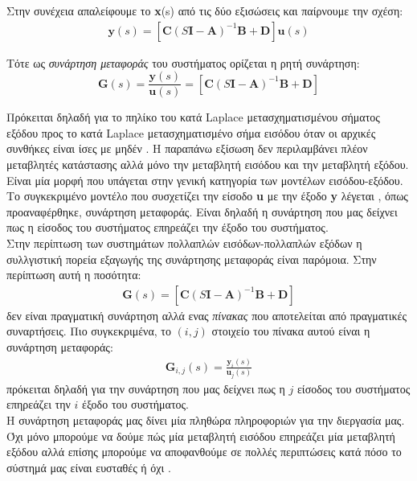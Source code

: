 \documentclass[11pt]{article} %
\numberwithin{equation}{subsection}
\begin{document}
Στην συνέχεια απαλείφουμε το \textbf{x}(s) από τις δύο εξισώσεις και παίρνουμε την σχέση:
\begin{align*}
\textbf{y}(s) = [\textbf{C}(S\textbf{I} - \textbf{A})^{-1}\textbf{B} + \textbf{D}]\textbf{u}(s)
\end{align*}

Τότε ως \textit{συνάρτηση μεταφοράς} του συστήματος ορίζεται η ρητή συνάρτηση:
\begin{equation}
\textbf{G}(s) = \frac{\textbf{y}(s)}{\textbf{u}(s)} =  [\textbf{C}(S\textbf{I} - \textbf{A})^{-1}\textbf{B} + \textbf{D}]
\end{equation}

Πρόκειται δηλαδή για το πηλίκο του κατά Laplace μετασχηματισμένου σήματος εξόδου προς το κατά Laplace μετασχηματισμένο σήμα εισόδου όταν οι αρχικές συνθήκες είναι ίσες με μηδέν \cite{controlbez}. Η παραπάνω εξίσωση δεν περιλαμβάνει πλέον μεταβλητές κατάστασης αλλά μόνο την μεταβλητή εισόδου και την μεταβλητή εξόδου. Είναι μία μορφή που υπάγεται στην γενική κατηγορία των μοντέλων εισόδου-εξόδου. Το συγκεκριμένο μοντέλο που συσχετίζει την είσοδο \textbf{u} με την έξοδο \textbf{y} λέγεται , όπως προαναφέρθηκε, συνάρτηση μεταφοράς. Είναι δηλαδή η συνάρτηση που μας δείχνει πως η είσοδος του συστήματος επηρεάζει την έξοδο του συστήματος.\\

Στην περίπτωση των συστημάτων πολλαπλών εισόδων-πολλαπλών εξόδων η συλλγιστική πορεία εξαγωγής της συνάρτησης μεταφοράς είναι παρόμοια. Στην περίπτωση αυτή η ποσότητα:
\begin{align*}
\textbf{G}(s) = [\textbf{C}(S\textbf{I} - \textbf{A})^{-1}\textbf{B} + \textbf{D}]
\end{align*}
δεν είναι πραγματική συνάρτηση αλλά ενας \textit{πίνακας} που αποτελείται από πραγματικές συναρτήσεις. Πιο συγκεκριμένα, το $(i,j)$ στοιχείο του πίνακα αυτού είναι η συνάρτηση μεταφοράς:
\begin{align*}
\textbf{G}_{i,j}(s) = \frac{\textbf{y}_{i}(s)}{\textbf{u}_{j}(s)}
\end{align*}
πρόκειται δηλαδή για την συνάρτηση που μας δείχνει πως η $j$ είσοδος του συστήματος επηρεάζει την $i$ έξοδο του συστήματος.\\

Η συνάρτηση μεταφοράς μας δίνει μία πληθώρα πληροφοριών για την διεργασία μας. Όχι μόνο μπορούμε να δούμε πώς μία μεταβλητή εισόδου επηρεάζει μία μεταβλητή εξόδου αλλά επίσης μπορούμε να αποφανθούμε σε πολλές περιπτώσεις κατά πόσο το σύστημά μας είναι ευσταθές ή όχι \cite{daoutidhs}.
\end{document}
